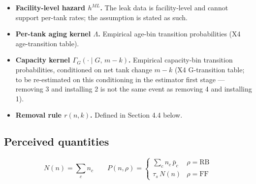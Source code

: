 \documentclass[
  letterpaper,
  DIV=11,
  numbers=noendperiod]{scrartcl}
\begin{document}
\begin{itemize}
  \textbf{Identification threats.} The slope-based identification
  compares hazard- and count-responsiveness across states with different
  contracts, so it is exposed to anything that makes those
  responsiveness differences for other reasons. Three concrete threats:
  (i) contract terms may be set in response to the state's tank stock
  --- a state with riskier old tanks choosing a higher deductible bends
  the slope comparison (reverse causality); (ii) enforcement and
  inspection intensity may co-vary with contract stringency, so behavior
  attributed to the deductible could partly reflect inspections; (iii)
  fund payout reliability differs across states --- a slow- or
  unreliably-paying fund changes the owner's effective exposure beyond
  the stated \(D\). Mitigations, stated without overselling: state fixed
  effects absorb level confounders, year fixed effects absorb common
  shocks, and the regime channel is cross-validated by the DiD; threats
  (i)--(iii) are why the welfare results lean hardest on the
  within-Texas and regime-contrast variation, with the cross-state
  slopes as supporting evidence. Zero-fee states still contribute to
  \(\hat\gamma_r\) through their deductibles.
\item
  \textbf{Facility-level hazard \(h^{ML}\).} The leak data is
  facility-level and cannot support per-tank rates; the assumption is
  stated as such.
\item
  \textbf{Per-tank aging kernel \(\Lambda\).} Empirical age-bin
  transition probabilities (X4 age-transition table).
\item
  \textbf{Capacity kernel \(\Gamma_G(\cdot \mid G,\, m-k)\).} Empirical
  capacity-bin transition probabilities, conditioned on net tank change
  \(m - k\) (X4 G-transition table; to be re-estimated on this
  conditioning in the estimator first stage --- removing 3 and
  installing 2 is not the same event as removing 4 and installing 1).
\item
  \textbf{Removal rule \(r(n,k)\).} Defined in Section 4.4 below.
\end{itemize}

\subsection{Perceived quantities}\label{perceived-quantities}

\[
N(n) = \sum_c n_c \qquad P(n,\rho) = \begin{cases} \sum_c n_c\, \bar p_c &
\rho = \mathrm{RB} \\ \tau_s\, N(n) & \rho = \mathrm{FF} \end{cases}
\]
\end{document}
